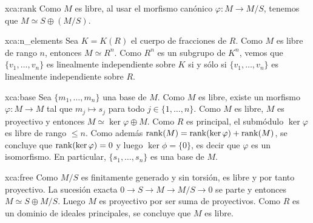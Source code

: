 \begin{sol}{xca:rank}
Como $M$ es libre, al usar el morfismo canónico $\varphi\colon M\to M/S$, tenemos que $M\simeq S\oplus (M/S)$.   
\end{sol}

\begin{sol}{xca:n_elements}
Sea $K=K(R)$ el cuerpo de fracciones de $R$. Como $M$ es libre de rango $n$, entonces $M\simeq R^n$. Como 
$R^n$ es un subgrupo de $K^n$, vemos que $\{v_1,\dots,v_n\}$ es linealmente independiente sobre $K$ si y sólo si $\{v_1,\dots,v_n\}$ 
es linealmente independiente sobre $R$.   
\end{sol}

\begin{sol}{xca:base}
Sea $\{m_1,\dots,m_n\}$ una base de $M$. Como $M$ es libre, existe un morfismo $\varphi\colon M\to M$ tal que $m_j\mapsto s_j$ para todo
$j\in\{1,\dots,n\}$. Como $M$ es libre, $M$ es proyectivo y entonces $M\simeq \ker\varphi\oplus M$. Como $R$ es principal, el submódulo
$\ker\varphi$ es libre de rango $\leq n$. Como además $\operatorname{rank}(M)=\operatorname{rank}(\ker\varphi)+\operatorname{rank}(M)$, se concluye que $\operatorname{rank}(\ker\varphi)=0$ y luego
$\ker\phi=\{0\}$, es decir que $\varphi$ es un isomorfismo. En particular, $\{s_1,\dots,s_n\}$ es una base de $M$.
\end{sol}

\begin{sol}{xca:free}
    Como $M/S$ es finitamente generado y sin torsión, es libre y por tanto
    proyectivo. La sucesión exacta $0\to S\to M\to M/S\to0$ se
    parte y entonces $M\simeq S\oplus M/S$. Luego $M$ es proyectivo por
    ser suma de proyectivos. Como $R$ es un dominio de ideales principales, se concluye que
    $M$ es libre.
\end{sol}